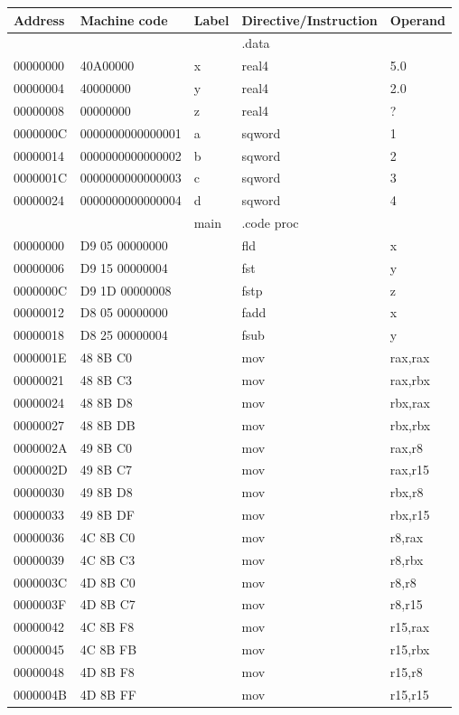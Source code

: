 \documentclass[10pt]{book}
\begin{document}
\begin{center}
\begin{tabular}{|l|l|l|l|l|}
\hline
Address & Machine code & Label & Directive/Instruction & Operand \\
\hline
 &  &  & .data &  \\
\hline
00000000 & 40A00000 & x & real4 & 5.0 \\
\hline
00000004 & 40000000 & y & real4 & 2.0 \\
\hline
00000008 & 00000000 & z & real4 & ? \\
\hline
0000000C & 0000000000000001 & a & sqword & 1 \\
\hline
00000014 & 0000000000000002 & b & sqword & 2 \\
\hline
0000001C & 0000000000000003 & c & sqword & 3 \\
\hline
00000024 & 0000000000000004 & d & sqword & 4 \\
\hline
 &  & main & .code proc &  \\
\hline
00000000 & D9 05 00000000 &  & fld & x \\
\hline
00000006 & D9 15 00000004 &  & fst & y \\
\hline
0000000C & D9 1D 00000008 &  & fstp & z \\
\hline
00000012 & D8 05 00000000 &  & fadd & x \\
\hline
00000018 & D8 25 00000004 &  & fsub & y \\
\hline
0000001E & 48 8B C0 &  & mov & rax,rax \\
\hline
00000021 & 48 8B C3 &  & mov & rax,rbx \\
\hline
00000024 & 48 8B D8 &  & mov & rbx,rax \\
\hline
00000027 & 48 8B DB &  & mov & rbx,rbx \\
\hline
0000002A & 49 8B C0 &  & mov & rax,r8 \\
\hline
0000002D & 49 8B C7 &  & mov & rax,r15 \\
\hline
00000030 & 49 8B D8 &  & mov & rbx,r8 \\
\hline
00000033 & 49 8B DF &  & mov & rbx,r15 \\
\hline
00000036 & 4C 8B C0 &  & mov & r8,rax \\
\hline
00000039 & 4C 8B C3 &  & mov & r8,rbx \\
\hline
0000003C & 4D 8B C0 &  & mov & r8,r8 \\
\hline
0000003F & 4D 8B C7 &  & mov & r8,r15 \\
\hline
00000042 & 4C 8B F8 &  & mov & r15,rax \\
\hline
00000045 & 4C 8B FB &  & mov & r15,rbx \\
\hline
00000048 & 4D 8B F8 &  & mov & r15,r8 \\
\hline
0000004B & 4D 8B FF &  & mov & r15,r15 \\
\hline
\end{tabular}
\end{center}
\end{document}
